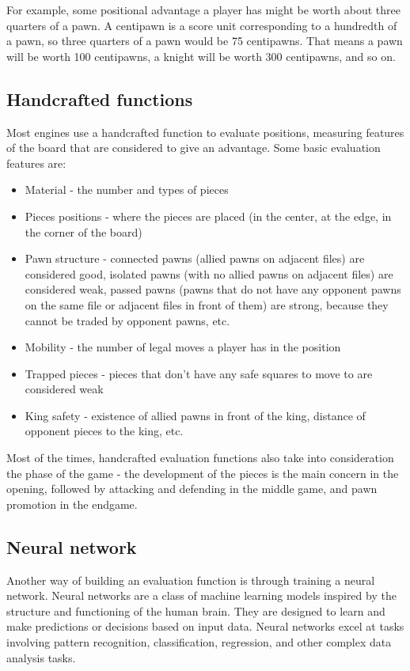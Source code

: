 For example, some positional advantage a player has might be worth about three quarters of a pawn. A centipawn is a score unit corresponding to a hundredth of a pawn, so three quarters of a pawn would be 75 centipawns. That means a pawn will be worth 100 centipawns, a knight will be worth 300 centipawns, and so on.

\subsection{Handcrafted functions}
\label{subsec:ch2sec3subsec2}

Most engines use a handcrafted function to evaluate positions, measuring features of the board that are considered to give an advantage. Some basic evaluation features are:
\begin{itemize}
    \item Material - the number and types of pieces
    \item Pieces positions - where the pieces are placed (in the center, at the edge, in the corner of the board)
    \item Pawn structure - connected pawns (allied pawns on adjacent files) are considered good, isolated pawns (with no allied pawns on adjacent files) are considered weak, passed pawns (pawns that do not have any opponent pawns on the same file or adjacent files in front of them) are strong, because they cannot be traded by opponent pawns, etc.
    \item Mobility - the number of legal moves a player has in the position
    \item Trapped pieces - pieces that don't have any safe squares to move to are considered weak
    \item King safety - existence of allied pawns in front of the king, distance of opponent pieces to the king, etc.
\end{itemize}

Most of the times, handcrafted evaluation functions also take into consideration the phase of the game - the development of the pieces is the main concern in the opening, followed by attacking and defending in the middle game, and pawn promotion in the endgame.

\subsection{Neural network}
\label{subsec:ch2sec3subsec3}

Another way of building an evaluation function is through training a neural network. Neural networks are a class of machine learning models inspired by the structure and functioning of the human brain. They are designed to learn and make predictions or decisions based on input data. Neural networks excel at tasks involving pattern recognition, classification, regression, and other complex data analysis tasks.

